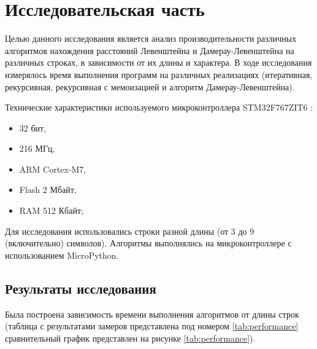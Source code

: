 \chapter{Исследовательская часть}

Целью данного исследования является анализ производительности различных алгоритмов нахождения расстояний Левенштейна и Дамерау-Левенштейна на различных строках, в зависимости от их длины и характера. В ходе исследования измерялось время выполнения программ на различных реализациях (итеративная, рекурсивная, рекурсивная с мемоизацией и алгоритм Дамерау-Левенштейна).


Технические характеристики используемого микроконтроллера STM32F767ZIT6 \cite{lit3}:
\begin{itemize}
	\item 32 бит, 
	\item 216 МГц, 
	\item ARM Cortex-M7, 
	\item Flash 2 Мбайт, 
	\item RAM 512 Кбайт;
\end{itemize}

Для исследования использовались строки разной длины (от 3 до 9 (включительно) символов). Алгоритмы выполнялись на микроконтроллере с использованием MicroPython.

\section {Результаты исследования}

Была построена зависимость времени выполнения алгоритмов от длины строк (таблица с результатами замеров представлена под номером \ref{tab:performance} сравнительный график представлен на рисунке \ref{tab:performance}).

